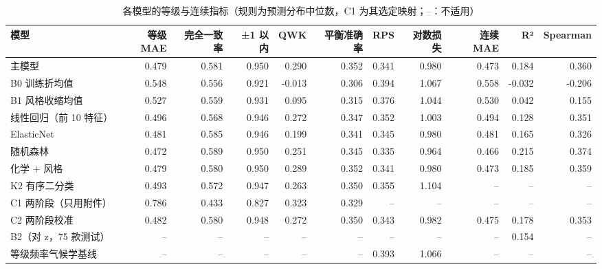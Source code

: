 \begin{table}[htbp]
\centering
\caption{各模型的等级与连续指标（规则为预测分布中位数，C1 为其选定映射；--：不适用）}\label{tab:q1_metrics}
\begin{tabular}{lrrrrrrrrrr}
\toprule
模型 & 等级 MAE & 完全一致率 & ±1 以内 & QWK & 平衡准确率 & RPS & 对数损失 & 连续 MAE & R² & Spearman \\
\midrule
主模型 & 0.479 & 0.581 & 0.950 & 0.290 & 0.352 & 0.341 & 0.980 & 0.473 & 0.184 & 0.360 \\
B0 训练折均值 & 0.548 & 0.556 & 0.921 & -0.013 & 0.306 & 0.394 & 1.067 & 0.558 & -0.032 & -0.206 \\
B1 风格收缩均值 & 0.527 & 0.559 & 0.931 & 0.095 & 0.315 & 0.376 & 1.044 & 0.530 & 0.042 & 0.155 \\
线性回归（前 10 特征） & 0.496 & 0.568 & 0.946 & 0.272 & 0.347 & 0.352 & 1.003 & 0.494 & 0.128 & 0.351 \\
ElasticNet & 0.481 & 0.585 & 0.946 & 0.199 & 0.341 & 0.345 & 0.980 & 0.481 & 0.165 & 0.326 \\
随机森林 & 0.472 & 0.589 & 0.950 & 0.251 & 0.345 & 0.335 & 0.964 & 0.466 & 0.215 & 0.374 \\
化学 + 风格 & 0.479 & 0.580 & 0.950 & 0.289 & 0.352 & 0.341 & 0.980 & 0.473 & 0.185 & 0.359 \\
K2 有序二分类 & 0.493 & 0.572 & 0.947 & 0.263 & 0.350 & 0.355 & 1.104 & -- & -- & -- \\
C1 两阶段（只用附件） & 0.786 & 0.433 & 0.827 & 0.323 & 0.329 & -- & -- & -- & -- & -- \\
C2 两阶段校准 & 0.482 & 0.580 & 0.948 & 0.272 & 0.350 & 0.343 & 0.982 & 0.475 & 0.178 & 0.353 \\
B2（对 z，75 款测试） & -- & -- & -- & -- & -- & -- & -- & -- & 0.154 & -- \\
等级频率气候学基线 & -- & -- & -- & -- & -- & 0.393 & 1.066 & -- & -- & -- \\
\bottomrule
\end{tabular}
\end{table}
